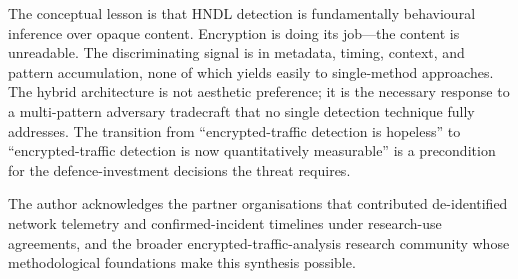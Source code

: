 \documentclass[sigconf,nonacm]{acmart}
\begin{document}
The conceptual lesson is that HNDL detection is fundamentally
behavioural inference over opaque content. Encryption is doing its
job---the content is unreadable. The discriminating signal is in
metadata, timing, context, and pattern accumulation, none of which
yields easily to single-method approaches. The hybrid architecture is
not aesthetic preference; it is the necessary response to a
multi-pattern adversary tradecraft that no single detection technique
fully addresses. The transition from ``encrypted-traffic detection is
hopeless'' to ``encrypted-traffic detection is now quantitatively
measurable'' is a precondition for the defence-investment decisions
the threat requires.

\begin{acks}
The author acknowledges the partner organisations that contributed
de-identified network telemetry and confirmed-incident timelines under
research-use agreements, and the broader encrypted-traffic-analysis
research community whose methodological foundations make this synthesis
possible.
\end{acks}
\end{document}
